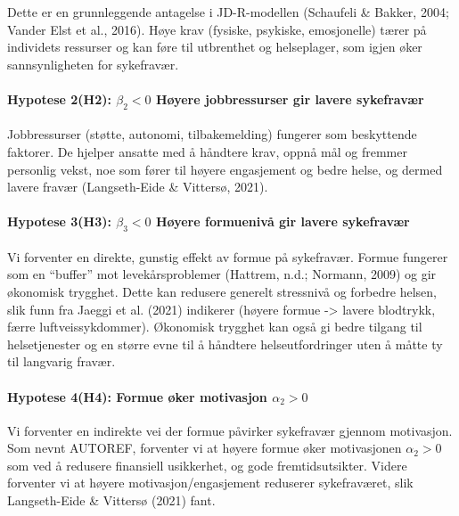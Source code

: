 \documentclass[
  12pt,
  a4paper,
  DIV=11,
  numbers=noendperiod]{scrartcl}
\let\oldparagraph\paragraph
\renewcommand{\paragraph}[1]{\oldparagraph{#1}\mbox{}}
\begin{document}
Dette er en grunnleggende antagelse i JD-R-modellen (Schaufeli \&
Bakker, 2004; Vander Elst et al., 2016). Høye krav (fysiske, psykiske,
emosjonelle) tærer på individets ressurser og kan føre til utbrenthet og
helseplager, som igjen øker sannsynligheten for sykefravær.

\paragraph{\texorpdfstring{Hypotese 2(H2): \(\beta_2 < 0\) Høyere
jobbressurser gir lavere
sykefravær}{Hypotese 2(H2): \textbackslash beta\_2 \textless{} 0 Høyere jobbressurser gir lavere sykefravær}}\label{hypotese-2h2-beta_2-0-huxf8yere-jobbressurser-gir-lavere-sykefravuxe6r}

Jobbressurser (støtte, autonomi, tilbakemelding) fungerer som
beskyttende faktorer. De hjelper ansatte med å håndtere krav, oppnå mål
og fremmer personlig vekst, noe som fører til høyere engasjement og
bedre helse, og dermed lavere fravær (Langseth-Eide \& Vittersø, 2021).

\paragraph{\texorpdfstring{Hypotese 3(H3): \(\beta_3 < 0\) Høyere
formuenivå gir lavere
sykefravær}{Hypotese 3(H3): \textbackslash beta\_3 \textless{} 0 Høyere formuenivå gir lavere sykefravær}}\label{hypotese-3h3-beta_3-0-huxf8yere-formuenivuxe5-gir-lavere-sykefravuxe6r}

Vi forventer en direkte, gunstig effekt av formue på sykefravær. Formue
fungerer som en ``buffer'' mot levekårsproblemer (Hattrem, n.d.;
Normann, 2009) og gir økonomisk trygghet. Dette kan redusere generelt
stressnivå og forbedre helsen, slik funn fra Jaeggi et al. (2021)
indikerer (høyere formue -\textgreater{} lavere blodtrykk, færre
luftveissykdommer). Økonomisk trygghet kan også gi bedre tilgang til
helsetjenester og en større evne til å håndtere helseutfordringer uten å
måtte ty til langvarig fravær.

\paragraph{\texorpdfstring{Hypotese 4(H4): Formue øker motivasjon
\(\alpha_2 > 0\)}{Hypotese 4(H4): Formue øker motivasjon \textbackslash alpha\_2 \textgreater{} 0}}\label{hypotese-4h4-formue-uxf8ker-motivasjon-alpha_2-0}

Vi forventer en indirekte vei der formue påvirker sykefravær gjennom
motivasjon. Som nevnt AUTOREF, forventer vi at høyere formue øker
motivasjonen \(\alpha_2 > 0\) som ved å redusere finansiell usikkerhet,
og gode fremtidsutsikter. Videre forventer vi at høyere
motivasjon/engasjement reduserer sykefraværet, slik Langseth-Eide \&
Vittersø (2021) fant.
\end{document}
